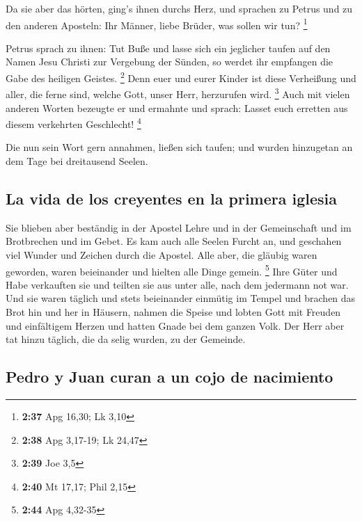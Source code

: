  Da sie aber das hörten, ging's ihnen durchs Herz, und
sprachen zu Petrus und zu den anderen Aposteln: Ihr Männer, liebe
Brüder, was sollen wir tun? \footnote{\textbf{2:37} Apg 16,30; Lk 3,10}

 Petrus sprach zu ihnen: Tut Buße und lasse sich ein
jeglicher taufen auf den Namen Jesu Christi zur Vergebung der Sünden, so
werdet ihr empfangen die Gabe des heiligen Geistes. \footnote{\textbf{2:38}
  Apg 3,17-19; Lk 24,47}  Denn euer und eurer Kinder ist
diese Verheißung und aller, die ferne sind, welche Gott, unser Herr,
herzurufen wird. \footnote{\textbf{2:39} Joe 3,5}  Auch
mit vielen anderen Worten bezeugte er und ermahnte und sprach: Lasset
euch erretten aus diesem verkehrten Geschlecht! \footnote{\textbf{2:40}
  Mt 17,17; Phil 2,15}

 Die nun sein Wort gern annahmen, ließen sich taufen; und
wurden hinzugetan an dem Tage bei dreitausend Seelen.

\hypertarget{la-vida-de-los-creyentes-en-la-primera-iglesia}{%
\subsection{La vida de los creyentes en la primera
iglesia}\label{la-vida-de-los-creyentes-en-la-primera-iglesia}}

 Sie blieben aber beständig in der Apostel Lehre und in
der Gemeinschaft und im Brotbrechen und im Gebet.  Es kam
auch alle Seelen Furcht an, und geschahen viel Wunder und Zeichen durch
die Apostel.  Alle aber, die gläubig waren geworden,
waren beieinander und hielten alle Dinge gemein. \footnote{\textbf{2:44}
  Apg 4,32-35}  Ihre Güter und Habe verkauften sie und
teilten sie aus unter alle, nach dem jedermann not war. 
Und sie waren täglich und stets beieinander einmütig im Tempel und
brachen das Brot hin und her in Häusern,  nahmen die
Speise und lobten Gott mit Freuden und einfältigem Herzen und hatten
Gnade bei dem ganzen Volk. Der Herr aber tat hinzu täglich, die da selig
wurden, zu der Gemeinde.

\hypertarget{pedro-y-juan-curan-a-un-cojo-de-nacimiento}{%
\subsection{Pedro y Juan curan a un cojo de
nacimiento}\label{pedro-y-juan-curan-a-un-cojo-de-nacimiento}}

